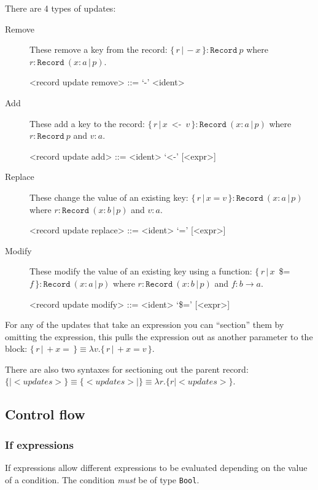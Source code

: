 There are 4 types of updates:
\begin{description}
\item[Remove]
These remove a key from the record: $\{\,r\,|\,-x\,\} : \mathtt{Record}\ p$ where $r : \mathtt{Record}\ (x : a\,|\,p)$.
\begin{grammar}
<record update remove> ::= `-' <ident>
\end{grammar}

\item[Add]
These add a key to the record: $\{\,r\,|\,x$\ <-\ $v\,\} : \mathtt{Record}\ (x : a\,|\,p)$ where $r : \mathtt{Record}\ p$ and $v : a$.
\begin{grammar}
<record update add> ::= <ident> `<-' [<expr>]
\end{grammar}

\item[Replace]
These change the value of an existing key: $\{\,r\,|\,x = v\,\} : \mathtt{Record}\ (x : a\,|\,p)$ where $r : \mathtt{Record}\ (x : b\,|\,p)$ and $v : a$.
\begin{grammar}
<record update replace> ::= <ident> `=' [<expr>]
\end{grammar}

\item[Modify]
These modify the value of an existing key using a function: $\{\,r\,|\,x$\ \$=\ $f\,\} :  \mathtt{Record}\ (x : a\,|\,p)$ where $r : \mathtt{Record}\ (x : b\,|\,p)$ and $f : b \to a$.
\begin{grammar}
<record update modify> ::= <ident> `\$=' [<expr>]
\end{grammar}
\end{description}

For any of the updates that take an expression you can ``section'' them by omitting the expression, this pulls the expression out as another parameter to the block: $\{\,r\,|\,+x =\,\} \equiv \lambda v. \{\,r\,|\,+x = v\,\}$.

There are also two syntaxes for sectioning out the parent record: $\{| <updates> \} \equiv \{ <updates> |\} \equiv \lambda r. \{ r | <updates> \}$.

\subsection{Control flow}

\subsubsection{If expressions}
If expressions allow different expressions to be evaluated depending on the value of a condition. The condition \textit{must} be of type \texttt{Bool}.

